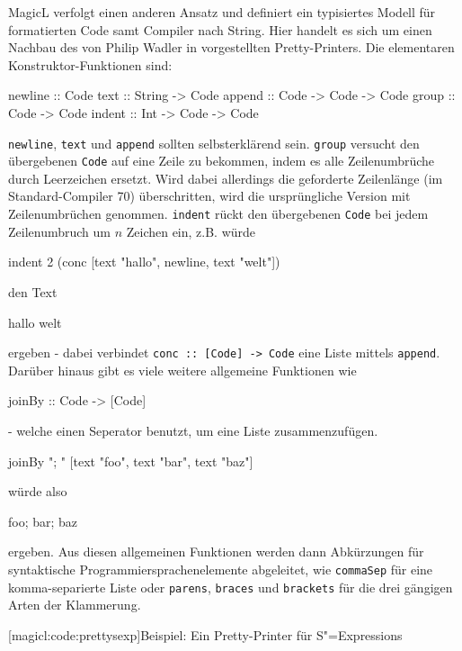 \documentclass[11pt, a4paper, bibgerm]{scrbook}
\newcommand\icode[1]{\lstinline?#1?}
\newcommand\lsubsection{}
\newcommand{\sexps}{S"=Expressions}
\begin{document}
MagicL verfolgt einen anderen Ansatz und definiert ein typisiertes
Modell für formatierten Code samt Compiler nach String. Hier handelt es
sich um einen Nachbau des von Philip Wadler in
\cite[S.223ff]{FunOfProgramming} vorgestellten Pretty-Printers. Die
elementaren Konstruktor-Funktionen sind:
\begin{code}
newline :: Code
text    :: String -> Code
append  :: Code   -> Code -> Code
group   :: Code   -> Code
indent  :: Int    -> Code -> Code
\end{code}

\icode{newline}, \icode{text} und \icode{append} sollten selbsterklärend
sein. \icode{group} versucht den übergebenen \icode{Code} auf eine Zeile
zu bekommen, indem es alle Zeilenumbrüche durch Leerzeichen
ersetzt. Wird dabei allerdings die geforderte Zeilenlänge (im
Standard-Compiler 70) überschritten, wird die ursprüngliche Version mit
Zeilenumbrüchen genommen. \icode{indent} rückt den übergebenen
\icode{Code} bei jedem Zeilenumbruch um $n$ Zeichen ein, z.B. würde
\begin{code}
indent 2 (conc [text "hallo", newline, text "welt"])
\end{code}
den Text
\begin{code}
hallo
  welt
\end{code}
ergeben - dabei verbindet \icode{conc :: [Code] -> Code} eine Liste
mittels \icode{append}. Darüber hinaus gibt es viele weitere allgemeine
Funktionen wie
\begin{code}
  joinBy :: Code -> [Code]
\end{code}
- welche einen Seperator benutzt, um eine Liste zusammenzufügen.
\begin{code}
joinBy "; " [text "foo", text "bar", text "baz"]
\end{code}
würde also
\begin{code}
foo; bar; baz
\end{code}
ergeben. Aus diesen allgemeinen Funktionen werden dann Abkürzungen für
syntaktische Programmiersprachenelemente abgeleitet, wie
\icode{commaSep} für eine komma-separierte Liste oder \icode{parens},
\icode{braces} und \icode{brackets} für die drei gängigen Arten der
Klammerung.

\lsubsection[magicl:code:prettysexp]{Beispiel: Ein Pretty-Printer für \sexps{}}
\end{document}
